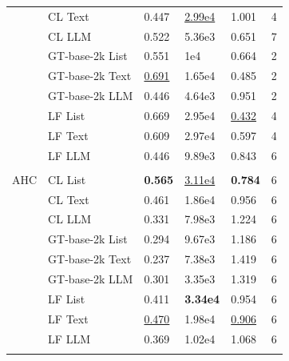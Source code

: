 \begin{table}[!h]
\begin{tabular}[t]{lllllr}
 & CL Text & 0.447 & \underline{2.99e4} & 1.001 & 4\\
\addlinespace
 & CL LLM & 0.522 & 5.36e3 & 0.651 & 7\\
 & GT-base-2k List & 0.551 & 1e4 & 0.664 & 2\\
 & GT-base-2k Text & \underline{0.691} & 1.65e4 & 0.485 & 2\\
 & GT-base-2k LLM & 0.446 & 4.64e3 & 0.951 & 2\\
 & LF List & 0.669 & 2.95e4 & \underline{0.432} & 4\\
\addlinespace
 & LF Text & 0.609 & 2.97e4 & 0.597 & 4\\
 & LF LLM & 0.446 & 9.89e3 & 0.843 & 6\\
\midrule\\
AHC & CL List & \textbf{0.565} & \underline{3.11e4} & \textbf{0.784} & 6\\
 & CL Text & 0.461 & 1.86e4 & 0.956 & 6\\
 & CL LLM & 0.331 & 7.98e3 & 1.224 & 6\\
\addlinespace
 & GT-base-2k List & 0.294 & 9.67e3 & 1.186 & 6\\
 & GT-base-2k Text & 0.237 & 7.38e3 & 1.419 & 6\\
 & GT-base-2k LLM & 0.301 & 3.35e3 & 1.319 & 6\\
 & LF List & 0.411 & \textbf{3.34e4} & 0.954 & 6\\
 & LF Text & \underline{0.470} & 1.98e4 & \underline{0.906} & 6\\
\addlinespace
 & LF LLM & 0.369 & 1.02e4 & 1.068 & 6\\
\midrule\\
\bottomrule
\end{tabular}
\end{table}
